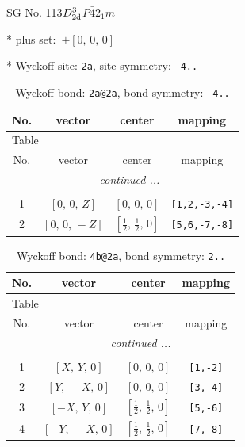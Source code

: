 \documentclass[fleqn,8pt]{jsarticle}
\begin{document}
\setcounter{MaxMatrixCols}{32}

\renewcommand{\tablename}{Table~}
\renewcommand{\figurename}{Figure~}
\begin{center}
\LARGE
SG No. 113\quad$D_{\rm 2d}^{3}$\quad$P\bar{4}2_1m$\quad[ tetragonal ]
\end{center}

* plus set:\,\,\,$+\left[ 0,\, 0,\, 0 \right]$


* Wyckoff site: {\tt 2a}, site symmetry: {\tt -4..}
\renewcommand{\arraystretch}{1.2}
\begin{longtable}{cccc}
\caption{Wyckoff bond: {\tt 2a@2a}, bond symmetry: {\tt -4..}}
 \\
 \hline \hline
No. & vector & center & mapping \\ \hline \endfirsthead

\multicolumn{3}{l}{\tablename\ \thetable{}} \\
 \hline \hline
No. & vector & center & mapping \\ \hline \endhead

 \hline \hline
\multicolumn{3}{r}{\footnotesize\it continued ...} \\ \endfoot

 \hline \hline
\multicolumn{3}{r}{} \\ \endlastfoot

1 & $\left[ 0,\, 0,\, Z \right]$ & $\left[ 0,\, 0,\, 0 \right]$ & {\tt [1,2,-3,-4]} \\ \hline
2 & $\left[ 0,\, 0,\, - Z \right]$ & $\left[ \frac{1}{2},\, \frac{1}{2},\, 0 \right]$ & {\tt [5,6,-7,-8]} \\
\end{longtable}
\renewcommand{\arraystretch}{1.2}
\begin{longtable}{cccc}
\caption{Wyckoff bond: {\tt 4b@2a}, bond symmetry: {\tt 2..}}
 \\
 \hline \hline
No. & vector & center & mapping \\ \hline \endfirsthead

\multicolumn{3}{l}{\tablename\ \thetable{}} \\
 \hline \hline
No. & vector & center & mapping \\ \hline \endhead

 \hline \hline
\multicolumn{3}{r}{\footnotesize\it continued ...} \\ \endfoot

 \hline \hline
\multicolumn{3}{r}{} \\ \endlastfoot

1 & $\left[ X,\, Y,\, 0 \right]$ & $\left[ 0,\, 0,\, 0 \right]$ & {\tt [1,-2]} \\ \hline
2 & $\left[ Y,\, - X,\, 0 \right]$ & $\left[ 0,\, 0,\, 0 \right]$ & {\tt [3,-4]} \\ \hline
3 & $\left[ - X,\, Y,\, 0 \right]$ & $\left[ \frac{1}{2},\, \frac{1}{2},\, 0 \right]$ & {\tt [5,-6]} \\ \hline
4 & $\left[ - Y,\, - X,\, 0 \right]$ & $\left[ \frac{1}{2},\, \frac{1}{2},\, 0 \right]$ & {\tt [7,-8]} \\
\end{longtable}
\end{document}
